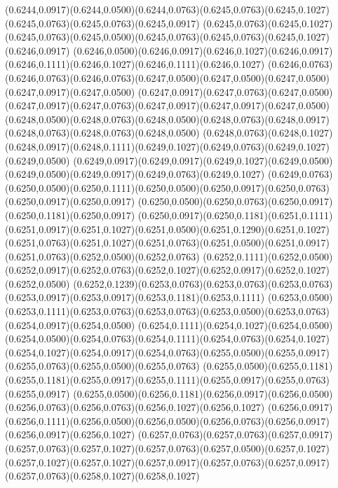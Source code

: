 (0.6244,0.0917)(0.6244,0.0500)(0.6244,0.0763)(0.6245,0.0763)(0.6245,0.1027)(0.6245,0.0763)(0.6245,0.0763)(0.6245,0.0917)
(0.6245,0.0763)(0.6245,0.1027)(0.6245,0.0763)(0.6245,0.0500)(0.6245,0.0763)(0.6245,0.0763)(0.6245,0.1027)(0.6246,0.0917)
(0.6246,0.0500)(0.6246,0.0917)(0.6246,0.1027)(0.6246,0.0917)(0.6246,0.1111)(0.6246,0.1027)(0.6246,0.1111)(0.6246,0.1027)
(0.6246,0.0763)(0.6246,0.0763)(0.6246,0.0763)(0.6247,0.0500)(0.6247,0.0500)(0.6247,0.0500)(0.6247,0.0917)(0.6247,0.0500)
(0.6247,0.0917)(0.6247,0.0763)(0.6247,0.0500)(0.6247,0.0917)(0.6247,0.0763)(0.6247,0.0917)(0.6247,0.0917)(0.6247,0.0500)
(0.6248,0.0500)(0.6248,0.0763)(0.6248,0.0500)(0.6248,0.0763)(0.6248,0.0917)(0.6248,0.0763)(0.6248,0.0763)(0.6248,0.0500)
(0.6248,0.0763)(0.6248,0.1027)(0.6248,0.0917)(0.6248,0.1111)(0.6249,0.1027)(0.6249,0.0763)(0.6249,0.1027)(0.6249,0.0500)
(0.6249,0.0917)(0.6249,0.0917)(0.6249,0.1027)(0.6249,0.0500)(0.6249,0.0500)(0.6249,0.0917)(0.6249,0.0763)(0.6249,0.1027)
(0.6249,0.0763)(0.6250,0.0500)(0.6250,0.1111)(0.6250,0.0500)(0.6250,0.0917)(0.6250,0.0763)(0.6250,0.0917)(0.6250,0.0917)
(0.6250,0.0500)(0.6250,0.0763)(0.6250,0.0917)(0.6250,0.1181)(0.6250,0.0917)
\PST@Solid(0.6250,0.0917)(0.6250,0.1181)(0.6251,0.1111)(0.6251,0.0917)(0.6251,0.1027)(0.6251,0.0500)(0.6251,0.1290)(0.6251,0.1027)
(0.6251,0.0763)(0.6251,0.1027)(0.6251,0.0763)(0.6251,0.0500)(0.6251,0.0917)(0.6251,0.0763)(0.6252,0.0500)(0.6252,0.0763)
(0.6252,0.1111)(0.6252,0.0500)(0.6252,0.0917)(0.6252,0.0763)(0.6252,0.1027)(0.6252,0.0917)(0.6252,0.1027)(0.6252,0.0500)
(0.6252,0.1239)(0.6253,0.0763)(0.6253,0.0763)(0.6253,0.0763)(0.6253,0.0917)(0.6253,0.0917)(0.6253,0.1181)(0.6253,0.1111)
(0.6253,0.0500)(0.6253,0.1111)(0.6253,0.0763)(0.6253,0.0763)(0.6253,0.0500)(0.6253,0.0763)(0.6254,0.0917)(0.6254,0.0500)
(0.6254,0.1111)(0.6254,0.1027)(0.6254,0.0500)(0.6254,0.0500)(0.6254,0.0763)(0.6254,0.1111)(0.6254,0.0763)(0.6254,0.1027)
(0.6254,0.1027)(0.6254,0.0917)(0.6254,0.0763)(0.6255,0.0500)(0.6255,0.0917)(0.6255,0.0763)(0.6255,0.0500)(0.6255,0.0763)
(0.6255,0.0500)(0.6255,0.1181)(0.6255,0.1181)(0.6255,0.0917)(0.6255,0.1111)(0.6255,0.0917)(0.6255,0.0763)(0.6255,0.0917)
(0.6255,0.0500)(0.6256,0.1181)(0.6256,0.0917)(0.6256,0.0500)(0.6256,0.0763)(0.6256,0.0763)(0.6256,0.1027)(0.6256,0.1027)
(0.6256,0.0917)(0.6256,0.1111)(0.6256,0.0500)(0.6256,0.0500)(0.6256,0.0763)(0.6256,0.0917)(0.6256,0.0917)(0.6256,0.1027)
(0.6257,0.0763)(0.6257,0.0763)(0.6257,0.0917)(0.6257,0.0763)(0.6257,0.1027)(0.6257,0.0763)(0.6257,0.0500)(0.6257,0.1027)
(0.6257,0.1027)(0.6257,0.1027)(0.6257,0.0917)(0.6257,0.0763)(0.6257,0.0917)(0.6257,0.0763)(0.6258,0.1027)(0.6258,0.1027)
